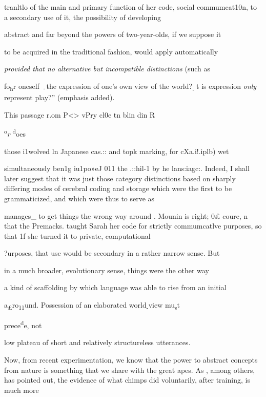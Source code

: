 tranltlo of the main and primary function of her code, social com\-mumcat10n, to a secondary use of it, the possibility of developing

abstract and far beyond the powers of two-year-olds, if we suppose it

to be acquired in the traditional fashion, would apply automatically

\textit{provided that no alternative but incompatible distinctions }(such as

fo\textsubscript{h}\textsubscript{{\textquotedbl}}r oneself \textsubscript{·}the expression of one's own view of the world?\textsubscript{. }t is expression \textit{only} represent play?'' (emphasis added).

This passage r.om P{\textless}{\textgreater} vPry cl0e tn blin din R

\textsuperscript{o}\textit{r} \textsuperscript{d}oes

those i1wolved ln Japanese cas.:: and topk marking, for cXa.i!.iplb) wet

simultaneously ben1g iu1po»eJ 011 the .::hil-1 by he lans:iagc:. Indeed, I shall later suggest that it was just those category distinctions based on sharply differing modes of cerebral coding and storage which were the first to be grammaticized, and which were thus to serve as

manages\_ to get things the wrong way around . Mounin is right; 0£ coure, n that the Premacks. taught Sarah her code for strictly com\-mumcatlve purposes, so that 1f she turned it to private, computational

?urposes, that use would be secondary in a rather narrow sense. But

in a much broader, evolutionary sense, things were the other way

a kind of scaffolding by which language was able to rise from an initial

a\textsubscript{£}ro\textsubscript{1}\textsubscript{1}und. Possession of an elaborated world\textsubscript{{}-}view mu\textsubscript{s}t

prece\textsuperscript{d}e, not

low plateau of short and relatively structureless utterances.

Now, from recent experimentation, we know that the power to abstract concepts from nature is something that we share with the great apes. As \citet{Mounin1976}, among others, has pointed out, the evidence of what chimps did voluntarily, after training, is much more

